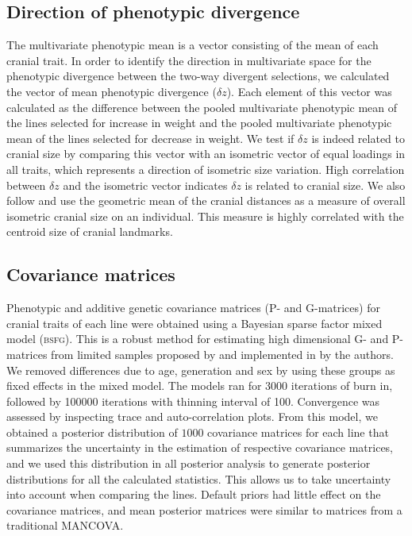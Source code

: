 \begin{refsection}
\subsection{Direction of phenotypic divergence}

The multivariate phenotypic mean is a vector consisting of the mean of
each cranial trait. In order to identify the direction in multivariate
space for the phenotypic divergence between the two-way divergent
selections, we calculated the vector of mean phenotypic divergence
(\(\delta z\)). Each element of this vector was calculated as the
difference between the pooled multivariate phenotypic mean of the lines
selected for increase in weight and the pooled multivariate phenotypic
mean of the lines selected for decrease in weight. We test if
\(\delta z\) is indeed related to cranial size by comparing this vector
with an isometric vector of equal loadings in all traits, which
represents a direction of isometric size variation. High correlation
between \(\delta z\) and the isometric vector indicates \(\delta z\) is
related to cranial size. We also follow \textcite{Mosimann1970-dz} and use the
geometric mean of the cranial distances as a measure of overall
isometric cranial size on an individual. This measure is highly
correlated with the centroid size of cranial landmarks.

\subsection{Covariance matrices}

Phenotypic and additive genetic covariance matrices (P- and G-matrices)
for cranial traits of each line were obtained using a Bayesian sparse
factor mixed model (\textsc{bsfg}). This is a robust method for estimating high
dimensional G- and P-matrices from limited samples proposed by
\textcite{Runcie2013-nr} and implemented in \textcite{Matlab2013-sd} by the authors. We removed
differences due to age, generation and sex by using these groups as
fixed effects in the mixed model. The models ran for 3000 iterations of
burn in, followed by 100000 iterations with thinning interval of 100.
Convergence was assessed by inspecting trace and auto-correlation plots.
From this model, we obtained a posterior distribution of \(1000\)
covariance matrices for each line that summarizes the uncertainty in the
estimation of respective covariance matrices, and we used this
distribution in all posterior analysis to generate posterior
distributions for all the calculated statistics. This allows us to take
uncertainty into account when comparing the lines. Default priors had
little effect on the covariance matrices, and mean posterior matrices
were similar to matrices from a traditional MANCOVA.


\end{refsection}
